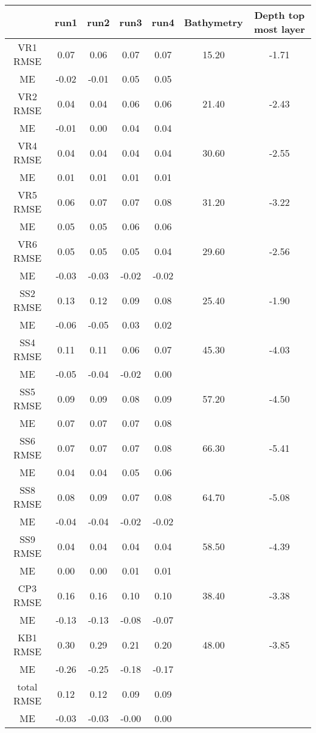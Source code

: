 \begin{center}
\begin{tabular}{|c|c|c|c|c||c|c|}
\hline
 & run1 & run2 & run3 & run4 & Bathymetry & Depth top most layer\\\hline
VR1 RMSE & 0.07 & 0.06 & 0.07 & 0.07 & 15.20 & -1.71\\
      ME & -0.02 & -0.01 & 0.05 & 0.05 & &\\\hline
VR2 RMSE & 0.04 & 0.04 & 0.06 & 0.06 & 21.40 & -2.43\\
      ME & -0.01 & 0.00 & 0.04 & 0.04 & &\\\hline
VR4 RMSE & 0.04 & 0.04 & 0.04 & 0.04 & 30.60 & -2.55\\
      ME & 0.01 & 0.01 & 0.01 & 0.01 & &\\\hline
VR5 RMSE & 0.06 & 0.07 & 0.07 & 0.08 & 31.20 & -3.22\\
      ME & 0.05 & 0.05 & 0.06 & 0.06 & &\\\hline
VR6 RMSE & 0.05 & 0.05 & 0.05 & 0.04 & 29.60 & -2.56\\
      ME & -0.03 & -0.03 & -0.02 & -0.02 & &\\\hline
SS2 RMSE & 0.13 & 0.12 & 0.09 & 0.08 & 25.40 & -1.90\\
      ME & -0.06 & -0.05 & 0.03 & 0.02 & &\\\hline
SS4 RMSE & 0.11 & 0.11 & 0.06 & 0.07 & 45.30 & -4.03\\
      ME & -0.05 & -0.04 & -0.02 & 0.00 & &\\\hline
SS5 RMSE & 0.09 & 0.09 & 0.08 & 0.09 & 57.20 & -4.50\\
      ME & 0.07 & 0.07 & 0.07 & 0.08 & &\\\hline
SS6 RMSE & 0.07 & 0.07 & 0.07 & 0.08 & 66.30 & -5.41\\
      ME & 0.04 & 0.04 & 0.05 & 0.06 & &\\\hline
SS8 RMSE & 0.08 & 0.09 & 0.07 & 0.08 & 64.70 & -5.08\\
      ME & -0.04 & -0.04 & -0.02 & -0.02 & &\\\hline
SS9 RMSE & 0.04 & 0.04 & 0.04 & 0.04 & 58.50 & -4.39\\
      ME & 0.00 & 0.00 & 0.01 & 0.01 & &\\\hline
CP3 RMSE & 0.16 & 0.16 & 0.10 & 0.10 & 38.40 & -3.38\\
      ME & -0.13 & -0.13 & -0.08 & -0.07 & &\\\hline
KB1 RMSE & 0.30 & 0.29 & 0.21 & 0.20 & 48.00 & -3.85\\
      ME & -0.26 & -0.25 & -0.18 & -0.17 & &\\\hline
total RMSE & 0.12 & 0.12 & 0.09 & 0.09 & &\\
      ME & -0.03 & -0.03 & -0.00 & 0.00 & &\\\hline
\end{tabular}
\end{center}
